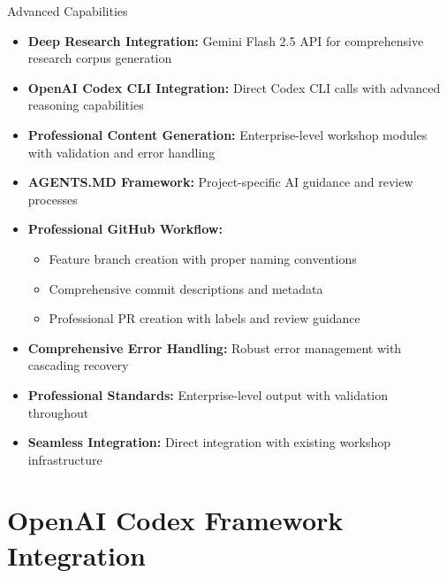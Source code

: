 \documentclass{beamer}
\begin{document}
\begin{frame}{Advanced Capabilities}
    \begin{itemize}
        \item \textbf{Deep Research Integration:} Gemini Flash 2.5 API for comprehensive research corpus generation
        \item \textbf{OpenAI Codex CLI Integration:} Direct Codex CLI calls with advanced reasoning capabilities
        \item \textbf{Professional Content Generation:} Enterprise-level workshop modules with validation and error handling
        \item \textbf{AGENTS.MD Framework:} Project-specific AI guidance and review processes
        \item \textbf{Professional GitHub Workflow:}
            \begin{itemize}
                \item Feature branch creation with proper naming conventions
                \item Comprehensive commit descriptions and metadata
                \item Professional PR creation with labels and review guidance
            \end{itemize}
        \item \textbf{Comprehensive Error Handling:} Robust error management with cascading recovery
        \item \textbf{Professional Standards:} Enterprise-level output with validation throughout
        \item \textbf{Seamless Integration:} Direct integration with existing workshop infrastructure
    \end{itemize}
\end{frame}

\section{OpenAI Codex Framework Integration} \label{L_section_codex}
\end{document}
